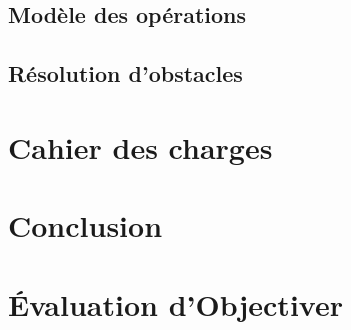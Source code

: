 \documentclass{report}
\begin{document}
	\section{Modèle des opérations}\label{section:operations}
		

	\section{Résolution d'obstacles}\label{section:obstacles}
		

\chapter{Cahier des charges}

\chapter*{Conclusion}
	

\chapter*{Évaluation d'Objectiver}
	
\end{document}
